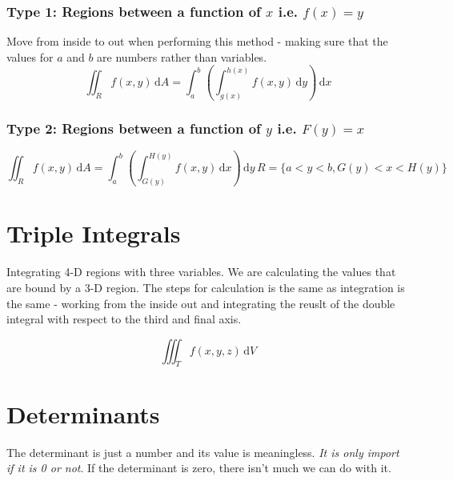 \documentclass[a4paper, 11pt]{article}
\begin{document}
\subsubsection{Type 1: Regions between a function of $x$ i.e. $f(x)=y$}
Move from inside to out when performing this method - making sure that the values for $a$ and $b$ are numbers rather than variables.
\[
    \iint_R f(x,y) \, \mathrm{d}A = \int_{a}^{b} \left( \int_{g(x)}^{h(x)} f(x,y) \, \mathrm{d} y \right) \, \mathrm{d}x
\]

\subsubsection{Type 2: Regions between a function of $y$ i.e. $F(y)=x$}
\[
    \iint_R f(x,y) \, \mathrm{d}A = \int_{a}^{b} \left( \int_{G(y)}^{H(y)} f(x,y) \, \mathrm{d}x \right) \, \mathrm{d}y \, R=\{ a < y < b , G(y) < x < H(y) \} 
\]

\section{Triple Integrals}
Integrating 4-D regions with three variables. We are calculating the values that are bound by a 3-D region. The steps for calculation is the same as integration is the same - working from the inside out and integrating the reuslt of the double integral with respect to the third and final axis.

\[
    \iiint_T f(x,y,z) \, \mathrm{d}V 
\]

\section{Determinants}
The determinant is just a number and its value is meaningless. \emph{It is only import if it is 0 or not}. If the determinant is zero, there isn't much we can do with it.
\end{document}
